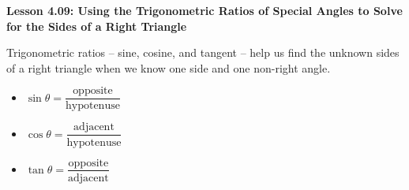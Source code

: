 \begin{center}
\textbf{Lesson 4.09: Using the Trigonometric Ratios of Special Angles to Solve for the Sides of a Right Triangle}
\end{center}

\vspace*{-1.5ex}

Trigonometric ratios -- sine, cosine, and tangent -- help us find the unknown sides of a right triangle when we know one side and one non-right angle.
\begin{multicols}{3}
\begin{itemize}
    \item \(\sin \theta = \dfrac{\text{opposite}}{\text{hypotenuse}}\)  
    \item \(\cos \theta = \dfrac{\text{adjacent}}{\text{hypotenuse}}\)  
    \item \(\tan \theta = \dfrac{\text{opposite}}{\text{adjacent}}\)  
\end{itemize}
\end{multicols}
